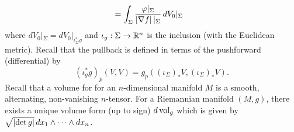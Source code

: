 \begin{exam}
\begin{enum}
\begin{align*}
      &= \int_\Sigma \frac{\varphi|_\Sigma}{\left\lvert \nabla f \right\rvert|_\Sigma} \, dV_0|_\Sigma
    \end{align*}
    where $dV_0|_\Sigma=dV_0|_{\iota_\Sigma^*g}$ and $\iota_g: \Sigma \to \mathbb{R}^n$ is the inclusion (with the Euclidean metric).
    Recall that the pullback is defined in terms of the pushforward (differential) by
    \[ (\iota_g^*g)_p(V,V) = g_p\left( (\iota_\Sigma)_*V,(\iota_\Sigma)_*V \right). \]
    Recall that a volume for for an $n$-dimensional manifold $M$ is a smooth, alternating, non-vanishing $n$-tensor.
    For a Riemannian manifold $(M,g)$, there exists a unique volume form (up to sign) $d\operatorname{vol}_g$ which is given by $\sqrt{\left\lvert \det g \right\rvert} \, dx_1 \wedge \cdots \wedge dx_n$.
  \end{enum}
\end{exam}
